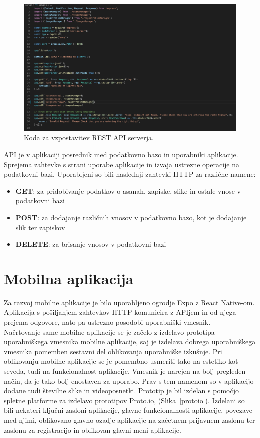 \documentclass[a4paper, 12pt]{book}
\begin{document}
\begin{figure}[htbp]
\begin{center}
\includegraphics[scale=0.33]{server.jpg} 
\end{center}
\caption{Koda za vzpostavitev REST API serverja.}
\label{server}
\end{figure}

API je v aplikaciji posrednik med podatkovno bazo in uporabniki aplikacije. Sprejema zahtevke s strani uporabe aplikacije in izvaja ustrezne operacije na podatkovni bazi. Uporabljeni so bili naslednji zahtevki HTTP za različne namene:

 \begin{itemize}
  \item \textbf{GET}: za pridobivanje podatkov o asanah, zapiske, slike in ostale vnose v podatkovni bazi
  \item \textbf{POST}: za dodajanje različnih vnosov v podatkovno bazo, kot je dodajanje slik ter zapiskov
  \item \textbf{DELETE}: za brisanje vnosov v podatkovni bazi
\end{itemize}

\section{Mobilna aplikacija}
Za razvoj mobilne aplikacije je bilo uporabljeno ogrodje Expo z React Native-om. Aplikacija s pošiljanjem zahtevkov HTTP komunicira z APIjem in od njega prejema odgovore, nato pa ustrezno posodobi uporabniški vmesnik.\\

Načrtovanje same mobilne aplikacije se je začelo z izdelavo prototipa uporabniškega vmesnika mobilne aplikacije, saj je izdelava dobrega uporabniškega vmesnika pomemben sestavni del oblikovanja uporabniške izkušnje. Pri oblikovanju mobilne aplikacije se je pomembno usmeriti tako na estetiko kot seveda, tudi na funkcionalnost aplikacije. Vmesnik je narejen na bolj pregleden način, da je tako bolj enostaven za uporabo. Prav s tem namenom so v aplikacijo dodane tudi številne slike in videoposnetki.
Prototip je bil izdelan s pomočjo spletne platforme za izdelavo prototipov Proto.io, (Slika~\ref{protoio}). Izdelani so bili nekateri ključni zasloni aplikacije, glavne funkcionalnosti aplikacije, povezave med njimi, oblikovano glavno ozadje aplikacije na začetnem prijavnem zaslonu ter zaslonu za registracijo in oblikovan glavni meni aplikacije.
\end{document}
